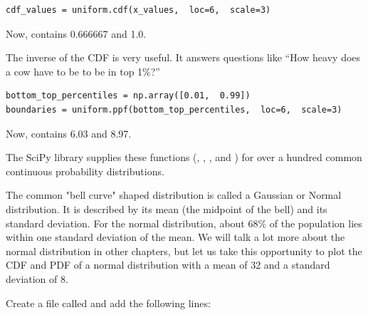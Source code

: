 \begin{verbatim}
cdf_values = uniform.cdf(x_values,  loc=6,  scale=3)
\end{verbatim}

Now,  contains 0.666667 and 1.0.

The inverse of the CDF is very useful.  It answers questions like ``How heavy does a cow have to be to be in top 1\%?''

\begin{verbatim}
bottom_top_percentiles = np.array([0.01,  0.99])
boundaries = uniform.ppf(bottom_top_percentiles,  loc=6,  scale=3)
\end{verbatim}

Now,  contains 6.03 and 8.97.

The SciPy library supplies these functions (, ,  , and ) for over a hundred 
common continuous probability distributions.  

The common "bell curve" shaped distribution is called a Gaussian  or Normal distribution. It is described by its mean (the midpoint of the bell) and its standard deviation.  For the normal distribution, about 68\% of the population lies within one standard deviation of the mean. 
We will talk a lot more about the normal distribution in other chapters,  but let us take this opportunity to plot the CDF and PDF of a normal distribution with a mean of 32 and a standard deviation of 8.

Create a file called  and add the following lines:


